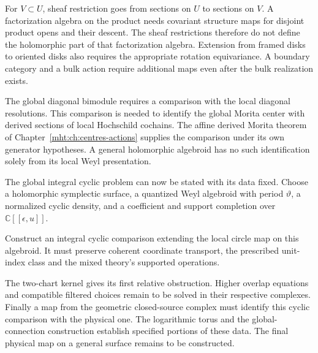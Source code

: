 For $V\subset U$, sheaf restriction goes from sections on $U$ to
sections on $V$. A factorization algebra on the product needs
covariant structure maps for disjoint product opens and their
descent. The sheaf restrictions therefore do not define the
holomorphic part of that factorization algebra.
Extension from
framed disks to oriented disks also requires the appropriate
rotation equivariance. A boundary category and a bulk action
require additional maps even after the bulk realization exists.

The global diagonal bimodule requires a comparison with the local
diagonal resolutions. This comparison is needed to identify the
global Morita center with derived sections of local Hochschild
cochains. The affine derived Morita theorem
of Chapter~\ref{mht:ch:centres-actions} supplies the comparison under its
own generator hypotheses. A general holomorphic algebroid has
no such identification solely from its local Weyl presentation.

The global integral cyclic problem can now be stated with its
data fixed. Choose a holomorphic symplectic surface, a quantized
Weyl algebroid with period $\vartheta$, a normalized cyclic
density, and a coefficient and support completion over
$\mathbb C[[\epsilon,u]]$.

Construct an integral cyclic comparison extending the local circle
map on this algebroid. It must preserve coherent coordinate
transport, the prescribed unit-index class and the mixed theory's
supported operations.

The two-chart
kernel gives its first relative obstruction. Higher overlap
equations and compatible filtered choices remain to be solved
in their respective complexes. Finally a map from the geometric
closed-source complex must identify this cyclic comparison with
the physical one. The logarithmic torus and the global-connection
construction establish specified portions of these data.
The final physical map on a general surface remains to be constructed.
